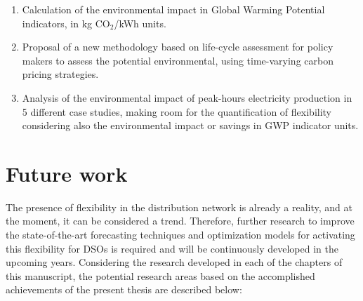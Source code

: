 \begin{itemize}
\begin{enumerate}
		\item Calculation of the environmental impact in Global Warming Potential indicators, in kg CO$_2$/kWh units. 
		\item Proposal of a new methodology based on life-cycle assessment for policy makers to assess the potential environmental, using time-varying carbon pricing strategies. 
		\item Analysis of the environmental impact of peak-hours electricity production in 5 different case studies, making room for the quantification of flexibility considering also the environmental impact or savings in GWP indicator units. 
	\end{enumerate}
\end{itemize}
	


\section{Future work}
The presence of flexibility in the distribution network is already a reality, and at the moment, it can be considered a trend. Therefore, further research to improve the state-of-the-art forecasting techniques and optimization models for activating this flexibility for DSOs is required and will be continuously developed in the upcoming years. 
Considering the research developed in each of the chapters of this manuscript, the potential research areas based on the accomplished achievements of the present thesis are described below: 

